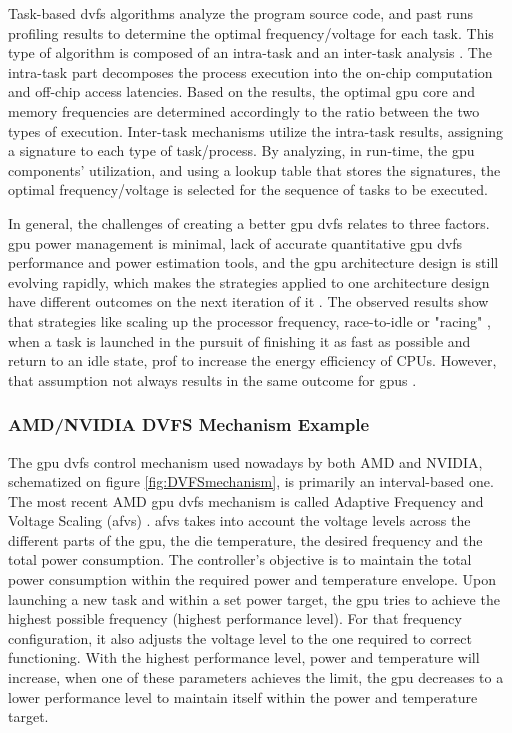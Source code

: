 Task-based \acrshort{dvfs} algorithms analyze the program source code, and past runs profiling results to determine the optimal frequency/voltage for each task. This type of algorithm is composed of an intra-task and an inter-task analysis \cite{noauthor_time_nodate}. The intra-task part decomposes the process execution into the on-chip computation and off-chip access latencies. Based on the results,  the optimal \acrshort{gpu} core and memory frequencies are determined accordingly to the ratio between the two types of execution. Inter-task mechanisms utilize the intra-task results, assigning a signature to each type of task/process. By analyzing, in run-time, the \acrshort{gpu} components' utilization, and using a lookup table that stores the signatures, the optimal frequency/voltage is selected for the sequence of tasks to be executed.

\bigskip
In general, the challenges of creating a better \acrshort{gpu} \acrshort{dvfs} relates to three factors. \acrshort{gpu} power management is minimal, lack of accurate quantitative \acrshort{gpu} \acrshort{dvfs} performance and power estimation tools, and the \acrshort{gpu} architecture design is still evolving rapidly, which makes the strategies applied to one architecture design have different outcomes on the next iteration of it \cite{mei_survey_2016}. The observed results show that strategies like scaling up the processor frequency, race-to-idle  \cite{hoffmann_racing_2013} or "racing" \cite{kim_racing_2015}, when a task is launched in the pursuit of finishing it as fast as possible and return to an idle state, prof to increase the energy efficiency of CPUs. However, that assumption not always results in the same outcome for \acrshort{gpu}s \cite{kim_racing_2015}. 

\subsubsection{AMD/NVIDIA DVFS Mechanism Example}

The \acrshort{gpu} \acrshort{dvfs} control mechanism used nowadays by both AMD and NVIDIA, schematized on figure \ref{fig:DVFSmechanism}, is primarily an interval-based one. The most recent AMD \acrshort{gpu} \acrshort{dvfs} mechanism is called Adaptive Frequency and Voltage Scaling (\acrshort{afvs}) \cite{amd_polaris_2017}. \acrshort{afvs} takes into account the voltage levels across the different parts of the \acrshort{gpu}, the die temperature, the desired frequency and the total power consumption. The controller's objective is to maintain the total power consumption within the required power and temperature envelope. Upon launching a new task and within a set power target, the \acrshort{gpu} tries to achieve the highest possible frequency (highest performance level). For that frequency configuration, it also adjusts the voltage level to the one required to correct functioning. With the highest performance level, power and temperature will increase, when one of these parameters achieves the limit, the \acrshort{gpu} decreases to a lower performance level to maintain itself within the power and temperature target. 

